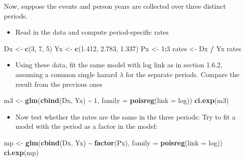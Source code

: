\documentclass[
]{book}
\newenvironment{Shaded}{\begin{snugshade}}{\end{snugshade}}
\newcommand{\AttributeTok}[1]{\textcolor[rgb]{0.13,0.29,0.53}{#1}}
\newcommand{\DecValTok}[1]{\textcolor[rgb]{0.00,0.00,0.81}{#1}}
\newcommand{\FloatTok}[1]{\textcolor[rgb]{0.00,0.00,0.81}{#1}}
\newcommand{\FunctionTok}[1]{\textcolor[rgb]{0.13,0.29,0.53}{\textbf{#1}}}
\newcommand{\NormalTok}[1]{#1}
\newcommand{\OtherTok}[1]{\textcolor[rgb]{0.56,0.35,0.01}{#1}}
\newcommand{\SpecialCharTok}[1]{\textcolor[rgb]{0.81,0.36,0.00}{\textbf{#1}}}
\providecommand{\tightlist}{%
  \setlength{\itemsep}{0pt}\setlength{\parskip}{0pt}}
\begin{document}
Now, suppose the events and person years are collected over three distinct periods.

\begin{itemize}
\tightlist
\item
  Read in the data and compute period-specific rates
\end{itemize}

\begin{Shaded}
\begin{Highlighting}[]
\NormalTok{Dx }\OtherTok{\textless{}{-}} \FunctionTok{c}\NormalTok{(}\DecValTok{3}\NormalTok{, }\DecValTok{7}\NormalTok{, }\DecValTok{5}\NormalTok{)}
\NormalTok{Yx }\OtherTok{\textless{}{-}} \FunctionTok{c}\NormalTok{(}\FloatTok{1.412}\NormalTok{, }\FloatTok{2.783}\NormalTok{, }\FloatTok{1.337}\NormalTok{)}
\NormalTok{Px }\OtherTok{\textless{}{-}} \DecValTok{1}\SpecialCharTok{:}\DecValTok{3}
\NormalTok{rates }\OtherTok{\textless{}{-}}\NormalTok{ Dx }\SpecialCharTok{/}\NormalTok{ Yx}
\NormalTok{rates}
\end{Highlighting}
\end{Shaded}

\begin{itemize}
\tightlist
\item
  Using these data,
  fit the same model with log link as in section 1.6.2, assuming a common single hazard \(\lambda\)
  for the separate periods. Compare the result from the previous ones
\end{itemize}

\begin{Shaded}
\begin{Highlighting}[]
\NormalTok{m3 }\OtherTok{\textless{}{-}} \FunctionTok{glm}\NormalTok{(}\FunctionTok{cbind}\NormalTok{(Dx, Yx) }\SpecialCharTok{\textasciitilde{}} \DecValTok{1}\NormalTok{, }\AttributeTok{family =} \FunctionTok{poisreg}\NormalTok{(}\AttributeTok{link =}\NormalTok{ log))}
\FunctionTok{ci.exp}\NormalTok{(m3)}
\end{Highlighting}
\end{Shaded}

\begin{itemize}
\tightlist
\item
  Now test whether the rates are the same in the three periods:
  Try to fit a model with the period as a factor in the model:
\end{itemize}

\begin{Shaded}
\begin{Highlighting}[]
\NormalTok{mp }\OtherTok{\textless{}{-}} \FunctionTok{glm}\NormalTok{(}\FunctionTok{cbind}\NormalTok{(Dx, Yx) }\SpecialCharTok{\textasciitilde{}} \FunctionTok{factor}\NormalTok{(Px), }\AttributeTok{family =} \FunctionTok{poisreg}\NormalTok{(}\AttributeTok{link =}\NormalTok{ log))}
\FunctionTok{ci.exp}\NormalTok{(mp)}
\end{Highlighting}
\end{Shaded}
\end{document}

